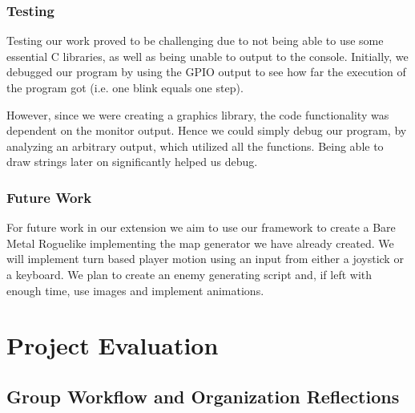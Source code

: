 \documentclass[11pt]{article}
\begin{document}
\subsubsection{Testing}
Testing our work proved to be challenging due to not being able to use some essential C libraries, as well as being unable to output to the console. Initially, we debugged our program by using the GPIO output to see how far the execution of the program got (i.e. one blink equals one step). 
\par However, since we were creating a graphics library, the code functionality was dependent on the monitor output. Hence we could simply debug our program, by analyzing an arbitrary output, which utilized all the functions. Being able to draw strings later on significantly helped us debug.

\subsubsection{Future Work}
For future work in our extension we aim to use our framework to create a Bare Metal Roguelike implementing the map generator we have already created. We will implement turn based player motion using an input from either a joystick or a keyboard. We plan to create an enemy generating script and, if left with enough time, use images and implement animations.


\section{Project Evaluation}

\subsection{Group Workflow and Organization Reflections}
\end{document}
